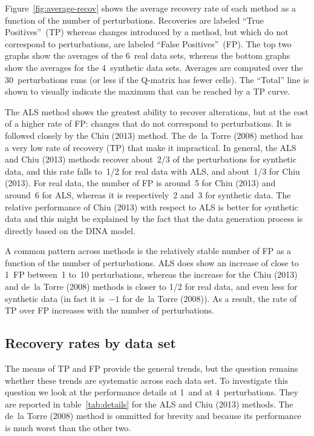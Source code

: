 Figure~\ref{fig:average-recov} shows the average recovery rate of each method as a function of the number of perturbations.
Recoveries are labeled ``True Positives''~(TP) whereas changes introduced by a method, but which do not correspond to perturbations,
are labeled ``False Positives''~(FP).  The top two graphs show the averages of the 6~real data sets, whereas the bottom graphs show
the averages for the 4~synthetic data sets.  Averages are computed over the 30~perturbations runs (or less if the Q-matrix has
fewer cells).  The ``Total'' line is shown to visually indicate the maximum that can be reached by a TP curve.

The ALS method shows the greatest ability to recover alterations, but at the cost of a higher rate of FP: changes
that do not correspond to perturbations.  It is followed closely by the Chiu (2013) method.  The de~la Torre (2008) method has a very low
rate of recovery (TP) that make it impractical. In general, the ALS and Chiu (2013) methods recover about~2/3 of the
perturbations for synthetic data, and this rate falls to~1/2 for real data with ALS, and about~1/3 for Chiu (2013).  For real
data, the number of FP is around~5 for Chiu (2013) and around~6 for ALS, whereas it is respectively~2 and~3 for
synthetic data. The relative performance of Chiu (2013) with respect to ALS is better for synthetic data and this might be
explained by the fact that the data generation process is directly based on the DINA model.

A common pattern across methods is the relatively stable number of FP as a function of the number of
perturbations.  ALS does show an increase of close to 1~FP between~1 to~10 perturbations, whereas the increase for the Chiu (2013) and
de~la Torre (2008) methods is closer to 1/2 for real data, and even less for synthetic data (in fact it is~$-1$ for de~la Torre (2008)).  As a
result, the rate of TP over FP increases with the number of perturbations.

\subsection{Recovery rates by data set}

The means of TP and FP provide the general trends, but the question remains whether these trends are systematic across each
data set.  To investigate this question we look at the performance details at 1~and at 4~perturbations.  They are reported in
table~\ref{tab:details} for the ALS and Chiu (2013) methods.  The de~la Torre (2008) method is ommitted for brevity and because its
performance is much worst than the other two.

